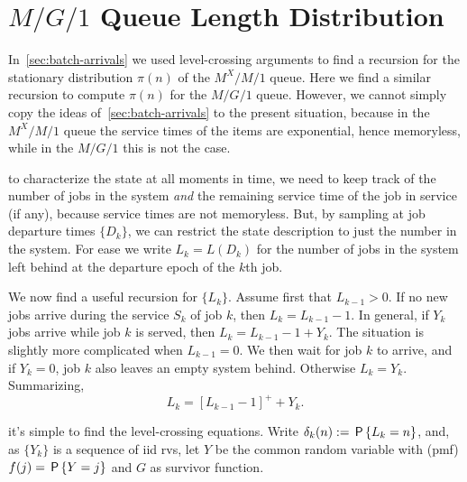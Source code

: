 

\section{$M/G/1$ Queue Length Distribution}\label{sec:distr-queue-length}



In~\cref{sec:batch-arrivals} we used level-crossing arguments to find a recursion for the stationary distribution $\pi(n)$ of the $M^X/M/1$ queue.
Here we find a similar recursion to compute $\pi(n)$ for the  $M/G/1$ queue.
However, we cannot simply copy the ideas of~\cref{sec:batch-arrivals} to the present situation, because in the $M^X/M/1$ queue the service times of the items are exponential, hence memoryless, while in the $M/G/1$ this is not the case.




 to characterize the state at all moments in time, we need to keep track of the number of jobs in the system \emph{and} the remaining service time of the job in service (if any), because service times are not memoryless.
But, by sampling at job departure times $\{D_k\}$, we can restrict the state description to just the number in the system. For ease we write $L_k=L(D_{k})$ for the number of jobs in the system left behind at the departure epoch of the $k$th job.

We now find a useful recursion for $\{L_k\}$. Assume first that $L_{k-1}>0$. If no new jobs arrive during the service $S_{k}$ of job $k$, then $L_{k}=L_{k-1}-1$. In general, if $Y_{k}$ jobs arrive while job $k$ is served, then $L_k=L_{k-1}-1 + Y_{k}$. The situation is slightly more complicated when $L_{k-1}=0$. We then wait for job $k$ to arrive, and if $Y_k=0$, job $k$ also leaves an empty system behind. Otherwise $L_k=Y_{k}$.  Summarizing,
\begin{equation*}
L_k=[L_{k-1}-1]^+ + Y_{k}.
\end{equation*}

 it's simple to find the level-crossing equations. Write $\delta_k(n) := \P{L_k=n}$, and,
as $\{Y_k\}$ is a sequence of iid rvs, let $Y$ be the common random variable with (pmf) $f(j) = \P{Y = j}$ and $G$ as survivor function.

